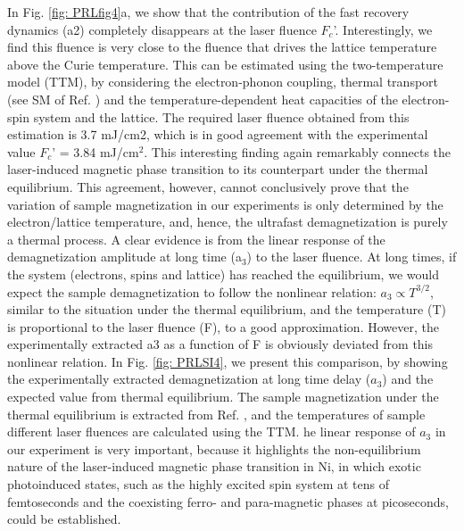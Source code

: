 In Fig. \ref{fig: PRLfig4}a, we show that the contribution of the fast recovery dynamics (a2) completely disappears at the laser fluence $F_c$'. Interestingly, we find this fluence is very close to the fluence that drives the lattice temperature above the Curie temperature. This can be estimated using the two-temperature model (TTM), by considering the electron-phonon coupling, thermal transport (see SM of Ref. \cite{Tengdin2018}) and the temperature-dependent heat capacities of the electron-spin system and the lattice. The required laser fluence obtained from this estimation is 3.7 mJ/cm2, which is in good agreement with the experimental value $F_c$' = 3.84 mJ/cm$^2$. This interesting finding again remarkably connects the laser-induced magnetic phase transition to its counterpart under the thermal equilibrium.
This agreement, however, cannot conclusively prove that the variation of sample magnetization in our experiments is only determined by the electron/lattice temperature, and, hence, the ultrafast demagnetization is purely a thermal process. A clear evidence is from the linear response of the demagnetization amplitude at long time (a$_3$) to the laser fluence. At long times, if the system (electrons, spins and lattice) has reached the equilibrium, we would expect the sample demagnetization to follow the nonlinear relation: $a_3 \propto T^{3/2}$, similar to the situation under the thermal equilibrium, and the temperature (T) is proportional to the laser fluence (F), to a good approximation. However, the experimentally extracted a3 as a function of F is obviously deviated from this nonlinear relation. In Fig. \ref{fig: PRLSI4}, we present this comparison, by showing the experimentally extracted demagnetization at long time delay ($a_3$) and the expected value from thermal equilibrium. The sample magnetization under the thermal equilibrium is extracted from Ref. \cite{Fognini2015} , and the temperatures of sample different laser fluences are calculated using the TTM. he linear response of $a_3$ in our experiment is very important, because it highlights the non-equilibrium nature of the laser-induced magnetic phase transition in Ni, in which exotic photoinduced states, such as the highly excited spin system at tens of femtoseconds and the coexisting ferro- and para-magnetic phases at picoseconds, could be established.


